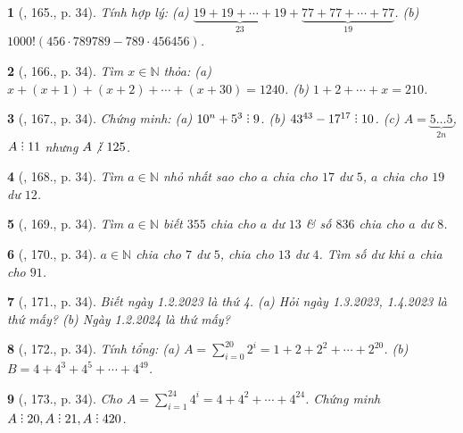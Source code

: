 \documentclass{article}
\newtheorem{baitoan}{}
\DeclareRobustCommand{\divby}{%
	\mathrel{\vbox{\baselineskip.65ex\lineskiplimit0pt\hbox{.}\hbox{.}\hbox{.}}}%
}
\begin{document}
\begin{baitoan}[\cite{Tuyen_Toan_6}, 165., p. 34]
	Tính hợp lý: (a) $\underbrace{19 + 19 + \cdots + 19}_{23} + \underbrace{77 + 77 + \cdots + 77}_{19}$. (b) $1000!(456\cdot789789 - 789\cdot456456)$.
\end{baitoan}

\begin{baitoan}[\cite{Tuyen_Toan_6}, 166., p. 34]
	Tìm $x\in\mathbb{N}$ thỏa: (a) $x + (x + 1) + (x + 2) + \cdots + (x + 30) = 1240$. (b) $1 + 2 + \cdots + x = 210$.
\end{baitoan}

\begin{baitoan}[\cite{Tuyen_Toan_6}, 167., p. 34]
	Chứng minh: (a) $10^n + 5^3\divby9$. (b) $43^{43} - 17^{17}\divby10$. (c) $A = \underbrace{5\ldots5}_{2n}$, $A\divby11$ nhưng $A\not{\divby}\ 125$.
\end{baitoan}

\begin{baitoan}[\cite{Tuyen_Toan_6}, 168., p. 34]
	Tìm $a\in\mathbb{N}$ nhỏ nhất sao cho $a$ chia cho $17$ dư $5$, $a$ chia cho $19$ dư $12$.
\end{baitoan}

\begin{baitoan}[\cite{Tuyen_Toan_6}, 169., p. 34]
	Tìm $a\in\mathbb{N}$ biết $355$ chia cho $a$ dư $13$ \& số $836$ chia cho $a$ dư $8$.
\end{baitoan}

\begin{baitoan}[\cite{Tuyen_Toan_6}, 170., p. 34]
	$a\in\mathbb{N}$ chia cho $7$ dư $5$, chia cho $13$ dư $4$. Tìm số dư khi $a$ chia cho $91$.
\end{baitoan}

\begin{baitoan}[\cite{Tuyen_Toan_6}, 171., p. 34]
	Biết ngày 1.2.2023 là thứ 4. (a) Hỏi ngày 1.3.2023, 1.4.2023 là thứ mấy? (b) Ngày 1.2.2024 là thứ mấy?
\end{baitoan}

\begin{baitoan}[\cite{Tuyen_Toan_6}, 172., p. 34]
	Tính tổng: (a) $A = \sum_{i=0}^{20} 2^i = 1 + 2 + 2^2 + \cdots + 2^{20}$. (b) $B = 4 + 4^3 + 4^5 + \cdots + 4^{49}$.
\end{baitoan}

\begin{baitoan}[\cite{Tuyen_Toan_6}, 173., p. 34]
	Cho $A = \sum_{i=1}^{24} 4^i = 4 + 4^2 + \cdots + 4^{24}$. Chứng minh $A\divby20,A\divby21,A\divby420$.
\end{baitoan}
\end{document}

